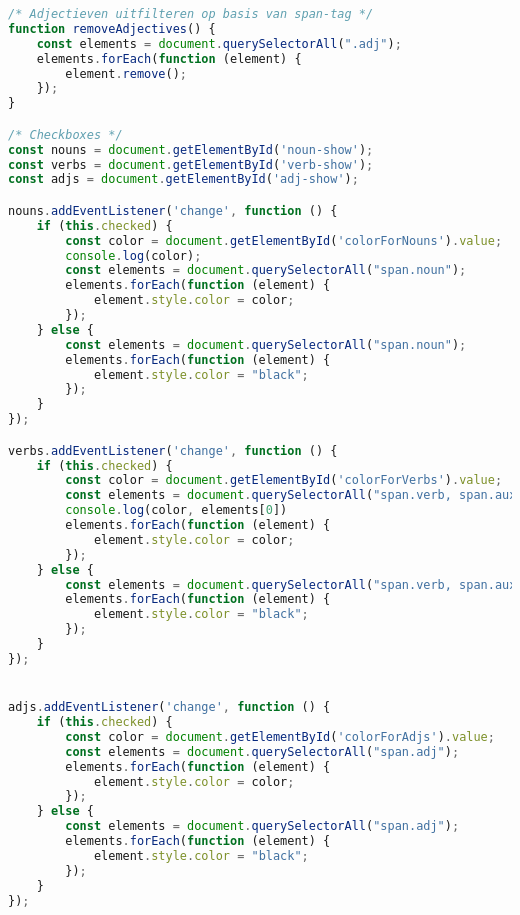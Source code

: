 \begin{lstlisting}[language=JavaScript, caption={De toegepaste scripts voor het verwijderen van adjectieven en togglen van type woorden.}, label={code:js-toggle-adjectives-nouns-verbs}]
/* Adjectieven uitfilteren op basis van span-tag */
function removeAdjectives() {
	const elements = document.querySelectorAll(".adj");
	elements.forEach(function (element) {
		element.remove();
	});
}

/* Checkboxes */
const nouns = document.getElementById('noun-show');
const verbs = document.getElementById('verb-show');
const adjs = document.getElementById('adj-show');

nouns.addEventListener('change', function () {
	if (this.checked) {
		const color = document.getElementById('colorForNouns').value;
		console.log(color);
		const elements = document.querySelectorAll("span.noun");
		elements.forEach(function (element) {
			element.style.color = color;
		});
	} else {
		const elements = document.querySelectorAll("span.noun");
		elements.forEach(function (element) {
			element.style.color = "black";
		});
	}
});

verbs.addEventListener('change', function () {
	if (this.checked) {
		const color = document.getElementById('colorForVerbs').value;
		const elements = document.querySelectorAll("span.verb, span.aux");
		console.log(color, elements[0])
		elements.forEach(function (element) {
			element.style.color = color;
		});
	} else {
		const elements = document.querySelectorAll("span.verb, span.aux");
		elements.forEach(function (element) {
			element.style.color = "black";
		});
	}
});


adjs.addEventListener('change', function () {
	if (this.checked) {
		const color = document.getElementById('colorForAdjs').value;
		const elements = document.querySelectorAll("span.adj");
		elements.forEach(function (element) {
			element.style.color = color;
		});
	} else {
		const elements = document.querySelectorAll("span.adj");
		elements.forEach(function (element) {
			element.style.color = "black";
		});
	}
});
\end{lstlisting}


